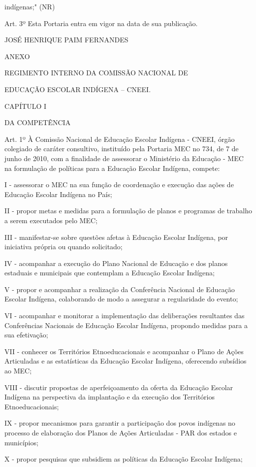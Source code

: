\documentclass[
]{book}
\begin{document}
indígenas;" (NR)

Art. 3º Esta Portaria entra em vigor na data de sua publicação.

JOSÉ HENRIQUE PAIM FERNANDES

ANEXO

REGIMENTO INTERNO DA COMISSÃO NACIONAL DE

EDUCAÇÃO ESCOLAR INDÍGENA -- CNEEI.

CAPÍTULO I

DA COMPETÊNCIA

Art. 1º À Comissão Nacional de Educação Escolar Indígena - CNEEI, órgão colegiado de caráter consultivo, instituído pela Portaria MEC no 734, de 7 de junho de 2010, com a finalidade de assessorar o Ministério da Educação - MEC na formulação de políticas para a Educação Escolar Indígena, compete:

I - assessorar o MEC na sua função de coordenação e execução das ações de Educação Escolar Indígena no País;

II - propor metas e medidas para a formulação de planos e programas de trabalho a serem executados pelo MEC;

III - manifestar-se sobre questões afetas à Educação Escolar Indígena, por iniciativa própria ou quando solicitado;

IV - acompanhar a execução do Plano Nacional de Educação e dos planos estaduais e municipais que contemplam a Educação Escolar Indígena;

V - propor e acompanhar a realização da Conferência Nacional de Educação Escolar Indígena, colaborando de modo a assegurar a regularidade do evento;

VI - acompanhar e monitorar a implementação das deliberações resultantes das Conferências Nacionais de Educação Escolar Indígena, propondo medidas para a sua efetivação;

VII - conhecer os Territórios Etnoeducacionais e acompanhar o Plano de Ações Articuladas e as estatísticas da Educação Escolar Indígena, oferecendo subsídios ao MEC;

VIII - discutir propostas de aperfeiçoamento da oferta da Educação Escolar Indígena na perspectiva da implantação e da execução dos Territórios Etnoeducacionais;

IX - propor mecanismos para garantir a participação dos povos indígenas no processo de elaboração dos Planos de Ações Articuladas - PAR dos estados e municípios;

X - propor pesquisas que subsidiem as políticas da Educação Escolar Indígena;
\end{document}
